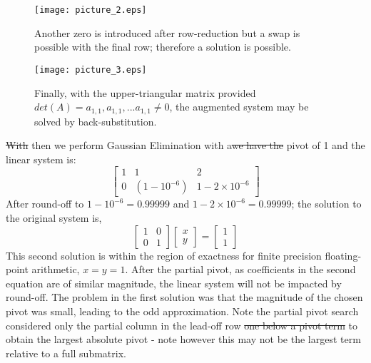 \documentclass[7pt]{article}
\begin{document}
\begin{figure}
	\begin{minipage}[c]{0.3\textwidth}
		\caption{
			Another zero is introduced after row-reduction but a swap is possible with the final row; therefore a solution is possible. 
		} \label{fig:03-03}
	\end{minipage}
	\begin{minipage}[c]{0.67\textwidth}
		\texttt{[image: picture\_2.eps]}
	\end{minipage}\hfill
\end{figure}

\begin{figure}
	\begin{minipage}[c]{0.3\textwidth}
		\caption{
			Finally, with the upper-triangular matrix provided $det(A) = a_{1,1}, a_{1,1},...a_{1,1} \neq 0$, the augmented system may be solved by back-substitution.
		} \label{fig:03-03}
	\end{minipage}
	\begin{minipage}[c]{0.67\textwidth}
		\texttt{[image: picture\_3.eps]}
	\end{minipage}\hfill
\end{figure}
\st{With} then we perform Gaussian Elimination with a\st{we have the} pivot of 1 and the linear system is:
\begin{equation*}
\left[
\begin{array} {cc|c}%
1 & 1 & 2 \\  
0 & (1 - 10^{-6})& 1 - 2 \times 10^{-6}
\end{array}  
\right]
\end{equation*}
After round-off to $1 - 10^{-6} = 0.99999$ and $1 - 2\times10^{-6} = 0.99999$; the  solution to the original system is,
\begin{equation*}
\left[
\begin{array}{cc}%
1 & 0  \\  
0 & 1
\end{array}  
\right]
\left[
\begin{array}{c}%
x \\  
y
\end{array}  
\right]
=
\left[
\begin{array}{c}%
1 \\  
1
\end{array}  
\right]
\end{equation*}
This second solution is within the region of exactness for finite precision floating-point arithmetic, $x=y=1$.  After the partial pivot, as coefficients in the second equation are of similar magnitude, the linear system will not be impacted by round-off. The problem in the first solution was that the magnitude of the chosen pivot was small, leading to the odd approximation. Note the partial pivot search considered only the partial column in the lead-off row  \st{one below a pivot term} to obtain the largest absolute pivot - {note} however this may not be the largest term relative to a full submatrix. 
\end{document}

